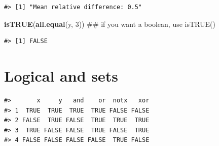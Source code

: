 \documentclass[]{book}
\newenvironment{Shaded}{\begin{snugshade}}{\end{snugshade}}
\newcommand{\KeywordTok}[1]{\textcolor[rgb]{0.13,0.29,0.53}{\textbf{#1}}}
\newcommand{\DecValTok}[1]{\textcolor[rgb]{0.00,0.00,0.81}{#1}}
\newcommand{\StringTok}[1]{\textcolor[rgb]{0.31,0.60,0.02}{#1}}
\newcommand{\CommentTok}[1]{\textcolor[rgb]{0.56,0.35,0.01}{\textit{#1}}}
\newcommand{\OtherTok}[1]{\textcolor[rgb]{0.56,0.35,0.01}{#1}}
\newcommand{\OperatorTok}[1]{\textcolor[rgb]{0.81,0.36,0.00}{\textbf{#1}}}
\newcommand{\NormalTok}[1]{#1}
\theoremstyle{definition}
\theoremstyle{definition}
\theoremstyle{definition}
\theoremstyle{remark}
\begin{document}
\begin{verbatim}
#> [1] "Mean relative difference: 0.5"
\end{verbatim}

\begin{Shaded}
\begin{Highlighting}[]
\KeywordTok{isTRUE}\NormalTok{(}\KeywordTok{all.equal}\NormalTok{(y, }\DecValTok{3}\NormalTok{))  ## if you want a boolean, use isTRUE()}
\end{Highlighting}
\end{Shaded}

\begin{verbatim}
#> [1] FALSE
\end{verbatim}

\section{Logical and sets}\label{logical-and-sets}

\begin{Shaded}
\end{Shaded}

\begin{verbatim}
#>       x     y   and    or  notx   xor
#> 1  TRUE  TRUE  TRUE  TRUE FALSE FALSE
#> 2 FALSE  TRUE FALSE  TRUE  TRUE  TRUE
#> 3  TRUE FALSE FALSE  TRUE FALSE  TRUE
#> 4 FALSE FALSE FALSE FALSE  TRUE FALSE
\end{verbatim}
\end{document}
